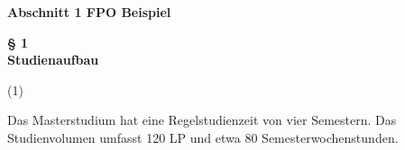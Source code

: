 \documentclass{article}\usepackage{helvet}\renewcommand{\familydefault}{\sfdefault}\usepackage[letterpaper,top=2cm,bottom=2cm,left=3cm,right=3cm,marginparwidth=1.75cm]{geometry}\usepackage[colorlinks=true,allcolors=red]{hyperref}\usepackage{enumitem}\usepackage{tabularx}\usepackage[T1]{fontenc}\setlist[enumerate,1]{label=\arabic*., left=0pt}\setlist[enumerate,2]{label=\alph*., left=0.5em}\setlist[enumerate,3]{label=\alph*\alph*., left=1em}\setlist[enumerate,4]{label=-, left=1.5em}\setlist{nosep}\setlength{\parindent}{0pt}
\begin{document}
	\hypertarget{main}{\textbf{Abschnitt 1 FPO Beispiel}\\}\hypertarget{label}{
	\begin{center}
		\textbf{§ 1\\Studienaufbau}
	\end{center}
}
	\begin{minipage}[t]
		{2em}
		(1)
	\end{minipage}
\hspace{0.5em}
	\begin{minipage}[t]
		{\dimexpr\linewidth-2em-0.5em\relax}
		Das Masterstudium hat eine Regelstudienzeit von vier Semestern. Das Studienvolumen umfasst 120 LP und etwa 80 Semesterwochenstunden.
	\end{minipage}

\medski
\end{document}
